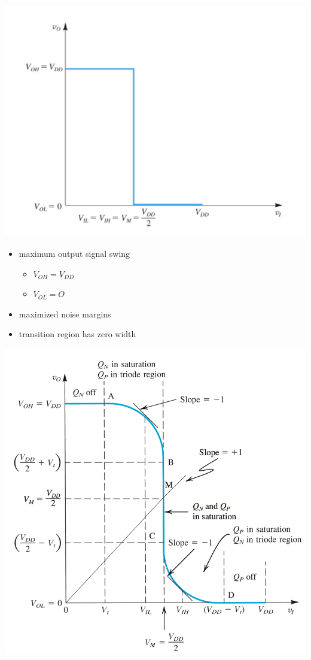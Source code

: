 \documentclass[12pt]{article}
\begin{document}
    \begin{center}
        \includegraphics[scale=0.75]{figures/s2.png}
    \end{center}

    \begin{itemize}
        \item maximum output signal swing
        \begin{itemize}
            \item $V_{OH} = V_{DD}$
            \item $V_{OL} = O$
        \end{itemize}
        \item maximized noise margins
        \item transition region has zero width
    \end{itemize}

    \begin{center}
        \includegraphics[scale=0.5]{figures/fig19.png}
    \end{center}
\end{document}
